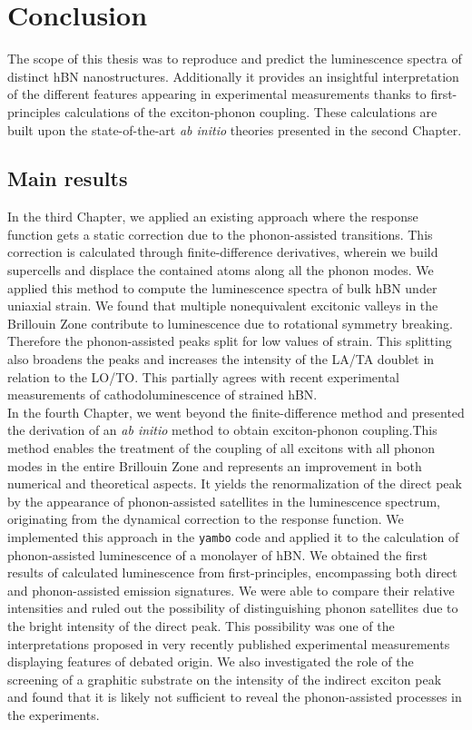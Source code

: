 \chapter*{Conclusion}

The scope of this thesis was to reproduce and predict the luminescence spectra of distinct hBN nanostructures. Additionally it provides an insightful interpretation of the different features appearing in experimental measurements thanks to first-principles calculations of the exciton-phonon coupling. These calculations are built upon the state-of-the-art \textit{ab initio} theories presented in the second Chapter.

\section*{Main results}
In the third Chapter, we applied an existing approach where the response function gets a static correction due to the phonon-assisted transitions. This correction is calculated through finite-difference derivatives, wherein we build supercells and displace the contained atoms along all the phonon modes. We applied this method to compute the luminescence spectra of bulk hBN under uniaxial strain. We found that multiple nonequivalent excitonic valleys in the Brillouin Zone contribute to luminescence due to rotational symmetry breaking.
Therefore the phonon-assisted peaks split for low values of strain. This splitting also broadens the peaks and increases the intensity of the LA/TA doublet in relation to the LO/TO.
This partially agrees with recent experimental measurements of cathodoluminescence of strained \acrshort{hBN}.\\

In the fourth Chapter, we went beyond the finite-difference method and presented the derivation of an \textit{ab initio} method to obtain exciton-phonon coupling.This method enables the treatment of the coupling of all excitons with all phonon modes in the entire Brillouin Zone and represents an improvement in both numerical and theoretical aspects. It yields the renormalization of the direct peak by the appearance of phonon-assisted satellites in the luminescence spectrum, originating from the dynamical correction to the response function. 
We implemented this approach in the \texttt{yambo} code and applied it to the calculation of phonon-assisted luminescence of
a monolayer of hBN. We obtained the first results of calculated luminescence from first-principles, encompassing both direct and phonon-assisted emission signatures. We were able to compare their relative intensities and ruled out the possibility of distinguishing phonon satellites due to the bright intensity of the direct peak. This possibility was one of the interpretations proposed in very recently published experimental measurements displaying features of debated origin. 
We also investigated the role of the screening of a graphitic substrate on the intensity of the indirect exciton peak and found that it is likely not sufficient to reveal the phonon-assisted processes in the experiments. \\


